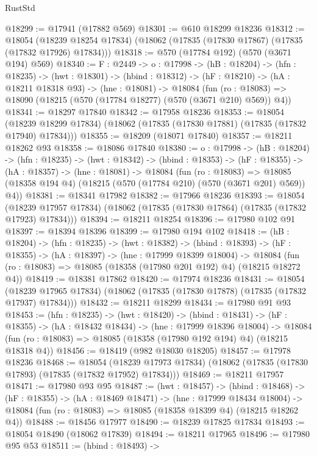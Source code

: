 \begin{lexlean}{RustStd}
\begin{coremodule}
@18299 := @17941 (@17882 @569)
@18301 := @610 @18299 @18236
@18312 := @18054
    (@18239 @18254 @17834)
    (@18062 (@17835 (@17830 @17867) (@17835 (@17832 @17926) @17834)))
@18318 := @570 (@17784 @192) (@570 (@3671 @194) @569)
@18340 := {F : @2449} ->
  {o : @17998} ->
  (hB : @18204) ->
  (hfn : @18235) ->
  (hwt : @18301) ->
  (hbind : @18312) ->
  (hF : @18210) ->
  (hA : @18211 @18318 @93) ->
  (hne : @18081) ->
  @18084 (fun (ro : @18083) => @18090 (@18215 (@570 (@17784 @18277) (@570 (@3671 @210) @569)) @4))
@18341 := @18297 @17840
@18342 := @17958 @18236
@18353 := @18054
    (@18239 @18299 @17834)
    (@18062 (@17835 (@17830 @17881) (@17835 (@17832 @17940) @17834)))
@18355 := @18209 (@18071 @17840)
@18357 := @18211 @18262 @93
@18358 := @18086 @17840
@18380 := {o : @17998} ->
  (hB : @18204) ->
  (hfn : @18235) ->
  (hwt : @18342) ->
  (hbind : @18353) ->
  (hF : @18355) ->
  (hA : @18357) ->
  (hne : @18081) ->
  @18084
    (fun (ro : @18083) =>
    @18085 (@18358 @194 @4) (@18215 (@570 (@17784 @210) (@570 (@3671 @201) @569)) @4))
@18381 := @18341 @17982
@18382 := @17966 @18236
@18393 := @18054
    (@18239 @17957 @17834)
    (@18062 (@17835 (@17830 @17864) (@17835 (@17832 @17923) @17834)))
@18394 := @18211 @18254
@18396 := @17980 @102 @91
@18397 := @18394 @18396
@18399 := @17980 @194 @102
@18418 := (hB : @18204) ->
  (hfn : @18235) ->
  (hwt : @18382) ->
  (hbind : @18393) ->
  (hF : @18355) ->
  (hA : @18397) ->
  (hne : @17999 @18399 @18004) ->
  @18084 (fun (ro : @18083) => @18085 (@18358 (@17980 @201 @192) @4) (@18215 @18272 @4))
@18419 := @18381 @17862
@18420 := @17974 @18236
@18431 := @18054
    (@18239 @17965 @17834)
    (@18062 (@17835 (@17830 @17878) (@17835 (@17832 @17937) @17834)))
@18432 := @18211 @18299
@18434 := @17980 @91 @93
@18453 := (hfn : @18235) ->
  (hwt : @18420) ->
  (hbind : @18431) ->
  (hF : @18355) ->
  (hA : @18432 @18434) ->
  (hne : @17999 @18396 @18004) ->
  @18084 (fun (ro : @18083) => @18085 (@18358 (@17980 @192 @194) @4) (@18215 @18318 @4))
@18456 := @18419 (@982 @18030 @18205)
@18457 := @17978 @18236
@18468 := @18054
    (@18239 @17973 @17834)
    (@18062 (@17835 (@17830 @17893) (@17835 (@17832 @17952) @17834)))
@18469 := @18211 @17957
@18471 := @17980 @93 @95
@18487 := (hwt : @18457) ->
  (hbind : @18468) ->
  (hF : @18355) ->
  (hA : @18469 @18471) ->
  (hne : @17999 @18434 @18004) ->
  @18084 (fun (ro : @18083) => @18085 (@18358 @18399 @4) (@18215 @18262 @4))
@18488 := @18456 @17977
@18490 := @18239 @17825 @17834
@18493 := @18054 @18490 (@18062 @17839)
@18494 := @18211 @17965
@18496 := @17980 @95 @53
@18511 := (hbind : @18493) ->

\end{coremodule}
\end{lexlean}
